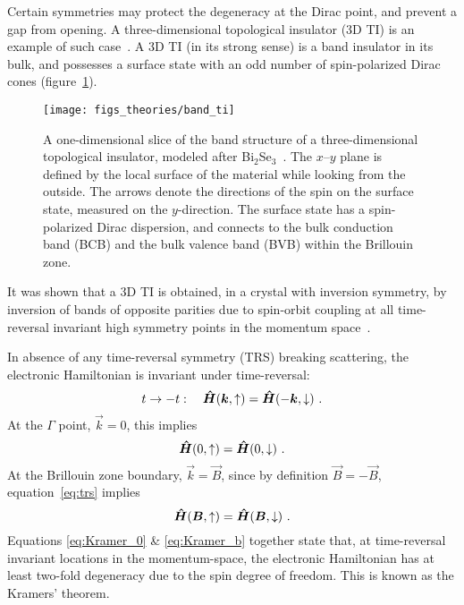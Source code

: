Certain symmetries may protect the degeneracy at the Dirac point, and prevent a gap from opening. A three-dimensional topological insulator (3D TI) is an example of such case~\cite{TI_Qi, TI_Col}. A 3D TI (in its strong sense) is a band insulator in its bulk, and possesses a surface state with an odd number of spin-polarized Dirac cones (figure~\ref{fig:bg_ti}). %
\begin{figure}[ht]%
    \centering%
    \texttt{[image: figs\_theories/band\_ti]}%
    \caption[Band structure of a 3D topological insulator]{\label{fig:bg_ti}A one-dimensional slice of the band structure of a three-dimensional topological insulator, modeled after Bi$_2$Se$_3$~\cite{TI_electronic_structure_zhang}. The $x$--$y$ plane is defined by the local surface of the material while looking from the outside. The arrows denote the directions of the spin on the surface state, measured on the $y$-direction. The surface state has a spin-polarized Dirac dispersion, and connects to the bulk conduction band (BCB) and the bulk valence band (BVB) within the Brillouin zone.}%
\end{figure}%
%
It was shown that a 3D TI is obtained, in a crystal with inversion symmetry, by inversion of bands of opposite parities due to spin-orbit coupling at all time-reversal invariant high symmetry points in the momentum space~\cite{Fu2007}.

In absence of any time-reversal symmetry (TRS) breaking scattering, the electronic Hamiltonian is invariant under time-reversal:%
\begin{equation}%
    t \to -t: \quad \op{H}(\vec{k}, \uparrow) = \op{H}(-\vec{k}, \downarrow)~.\label{eq:trs}%
\end{equation}%
At the $\Gamma$ point, $\vec{k}=0$, this implies%
\begin{equation}%
    \op{H}(0, \uparrow) = \op{H}(0, \downarrow)~.\label{eq:Kramer_0}%
\end{equation}%
At the Brillouin zone boundary, $\vec{k} = \vec{B}$, since by definition $\vec{B} = -\vec{B}$, equation~\ref{eq:trs} implies%
\begin{equation}%
    \op{H}(\vec{B}, \uparrow) = \op{H}(\vec{B}, \downarrow)~.\label{eq:Kramer_b}%
\end{equation}%
Equations \ref{eq:Kramer_0} \& \ref{eq:Kramer_b} together state that, at time-reversal invariant locations in the momentum-space, the electronic Hamiltonian has at least two-fold degeneracy due to the spin degree of freedom. This is known as the Kramers' theorem.

